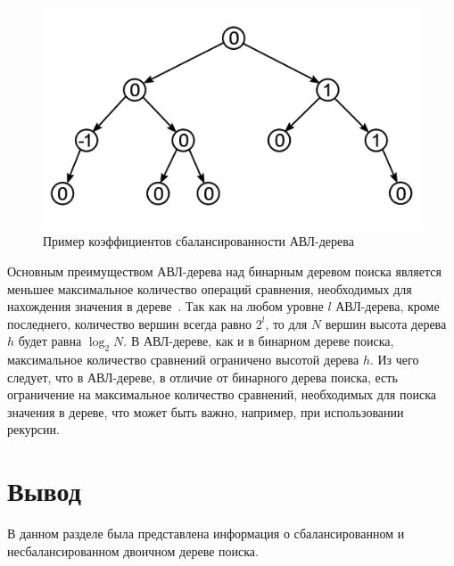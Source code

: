 \begin{figure}[h]
	\centering
	\includegraphics[height=0.3\textheight]{img/avl-tree.png}
	\caption{Пример коэффициентов сбалансированности АВЛ-дерева}
	\label{fig:avl_tree_example}
\end{figure}

Основным преимуществом АВЛ-дерева над бинарным деревом поиска является меньшее максимальное количество операций сравнения, необходимых для нахождения значения в дереве~\cite{skien}.
Так как на любом уровне $l$ АВЛ-дерева, кроме последнего, количество вершин всегда равно $2^l$, то для $N$ вершин высота дерева $h$ будет равна $\log_2 N$.
В АВЛ-дереве, как и в бинарном дереве поиска, максимальное количество сравнений ограничено высотой дерева $h$.
Из чего следует, что в АВЛ-дереве, в отличие от бинарного дерева поиска, есть ограничение на максимальное количество сравнений, необходимых для поиска значения в дереве, что может быть важно, например, при использовании рекурсии.


\section*{Вывод}

В данном разделе была представлена информация о сбалансированном и несбалансированном двоичном дереве поиска.